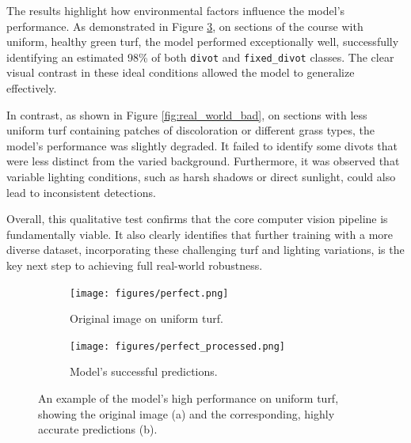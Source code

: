 The results highlight how environmental factors influence the model's performance. As demonstrated in Figure \ref{fig:real_world_good}, on sections of the course with uniform, healthy green turf, the model performed exceptionally well, successfully identifying an estimated 98\% of both \texttt{divot} and \texttt{fixed\_divot} classes. The clear visual contrast in these ideal conditions allowed the model to generalize effectively.

In contrast, as shown in Figure \ref{fig:real_world_bad}, on sections with less uniform turf containing patches of discoloration or different grass types, the model's performance was slightly degraded. It failed to identify some divots that were less distinct from the varied background. Furthermore, it was observed that variable lighting conditions, such as harsh shadows or direct sunlight, could also lead to inconsistent detections.

Overall, this qualitative test confirms that the core computer vision pipeline is fundamentally viable. It also clearly identifies that further training with a more diverse dataset, incorporating these challenging turf and lighting variations, is the key next step to achieving full real-world robustness.

\begin{figure}[h!]
    \centering
    \begin{subfigure}[b]{0.49\textwidth}
        \centering
        \texttt{[image: figures/perfect.png]} 
        \caption{Original image on uniform turf.}
        \label{fig:good_original}
    \end{subfigure}
    \hfill %
    \begin{subfigure}[b]{0.49\textwidth}
        \centering
        \texttt{[image: figures/perfect\_processed.png]} 
        \caption{Model's successful predictions.}
        \label{fig:good_prediction}
    \end{subfigure}
    \caption[High-performance example of divot detection.]
    {An example of the model's high performance on uniform turf, showing the original image (a) and the corresponding, highly accurate predictions (b).}
    \label{fig:real_world_good}

\end{figure}

